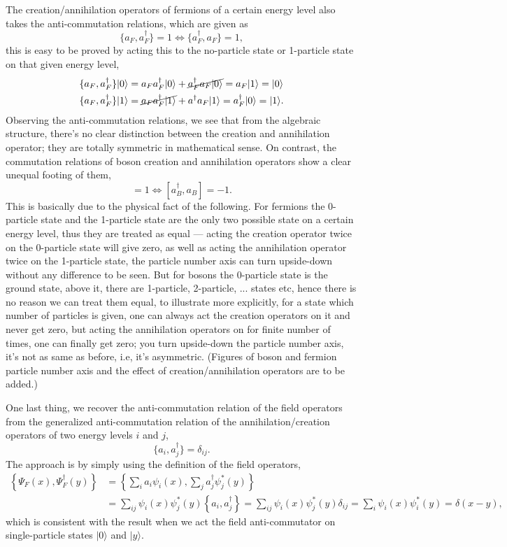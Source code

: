 \documentclass{article}
\newcommand{\be}{\begin{equation}}
\newcommand{\ee}{\end{equation}}
\renewcommand{\1}{\left}
\renewcommand{\2}{\right}
\newcommand{\ra}{\rangle}
\newcommand{\del}{\delta}
\begin{document}
The creation/annihilation operators of fermions of a certain energy level also takes the anti-commutation relations, which are given as
\be
\{a_F,a_F^\dag\}=1 \Longleftrightarrow \{a_F^\dag, a_F\}=1,
\ee
this is easy to be proved by acting this to the no-particle state or 1-particle state on that given energy level,
\be\begin{split}
\{a_F,a_F^\dag\}|0\ra&=a_Fa_F^\dag |0\ra+\cancel{a_F^\dag a_F|0\ra}=a_F|1\ra=|0\ra\\
\{a_F,a_F^\dag\}|1\ra&=\cancel{a_Fa_F^\dag |1\ra}+a^\dag a_F|1\ra=a_F^\dag|0\ra=|1\ra.
\end{split}\ee
Observing the anti-commutation relations, we see that from the algebraic structure, there's no clear distinction between the creation and annihilation operator; they are totally symmetric in mathematical sense. On contrast, the commutation relations of boson creation and annihilation operators show a clear unequal footing of them,
\be [a_B,a_B^\dag]=1 \Longleftrightarrow [a_B^\dag,a_B]=-1. \ee
This is basically due to the physical fact of the following. For fermions the 0-particle state and the 1-particle state are the only two possible state on a certain energy level, thus they are treated as equal --- acting the creation operator twice on the 0-particle state will give zero, as well as acting the annihilation operator twice on the 1-particle state, the particle number axis can turn upside-down without any difference to be seen. But for bosons the 0-particle state is the ground state, above it, there are 1-particle, 2-particle, ... states etc, hence there is no reason we can treat them equal, to illustrate more explicitly, for a state which number of particles is given, one can always act the creation operators on it and never get zero, but acting the annihilation operators on for finite number of times, one can finally get zero; you turn upside-down the particle number axis, it's not as same as before, i.e, it's asymmetric. (Figures of boson and fermion particle number axis and the effect of creation/annihilation operators are to be added.)

One last thing, we recover the anti-commutation relation of the field operators from the generalized anti-commutation relation of the annihilation/creation operators of two energy levels $i$ and $j$,
\be \{a_i,a_j^\dag\}=\del_{ij}. \ee
The approach is by simply using the definition of the field operators,
\be\begin{split}
\1\{\Psi_F(x),\Psi_F^\dag(y)\2\}&=\1\{\sum_i a_i \psi_i(x),\sum_j a_j^\dag \psi_j^*(y)\2\}\\
&=\sum_{ij}\psi_i(x)\psi_j^*(y)\1\{a_i,a_j^\dag\2\}=\sum_{ij}\psi_i(x)\psi_j^*(y)\del_{ij}=\sum_i\psi_i(x)\psi_i^*(y)=\del(x-y),
\end{split}\ee
which is consistent with the result when we act the field anti-commutator on single-particle states $|0\ra$ and $|y\ra$.
\end{document}
